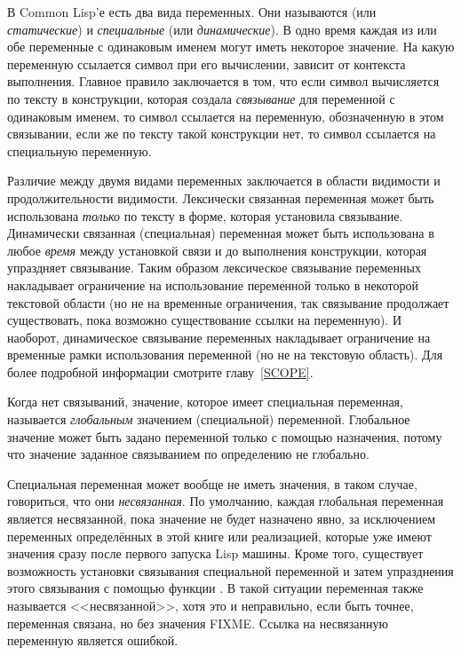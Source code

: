 В Common Lisp'е есть два вида переменных. Они называются  (или
\emph{статические}) и \emph{специальные} (или \emph{динамические}).
В одно время каждая из или обе переменные с одинаковым именем могут иметь
некоторое значение. На какую переменную ссылается символ при его вычислении,
зависит от контекста выполнения. Главное правило заключается в том, что если
символ вычисляется по тексту в конструкции, которая создала \emph{связывание} для
переменной с одинаковым именем, то символ ссылается на переменную, обозначенную
в этом связывании, если же по тексту такой конструкции нет, то символ ссылается
на специальную переменную.

Различие между двумя видами переменных заключается в области видимости и
продолжительности видимости. Лексически связанная переменная может быть использована
\emph{только} по тексту в форме, которая установила связывание. Динамически
связанная (специальная) переменная может быть использована в любое
\emph{время} между установкой связи и до выполнения конструкции, которая
упраздняет связывание. Таким образом лексическое связывание переменных
накладывает ограничение на использование переменной только в некоторой текстовой
области (но не на временные ограничения, так связывание продолжает существовать,
пока возможно существование ссылки на переменную). И наоборот, динамическое
связывание переменных накладывает ограничение на временные рамки использования
переменной (но не на текстовую область).
Для более подробной информации смотрите главу~\ref{SCOPE}.

Когда нет связываний, значение, которое имеет специальная
переменная, называется \emph{глобальным} значением (специальной) переменной.
Глобальное значение может быть задано переменной только с помощью назначения,
потому что значение заданное связыванием по определению не глобально.

Специальная переменная может вообще не иметь значения, в таком случае,
говориться, что они \emph{несвязанная}. 
По умолчанию, каждая глобальная переменная является несвязанной, пока значение
не будет назначено явно, за исключением переменных определённых в этой книге или
реализацией, которые уже имеют значения сразу после первого запуска Lisp машины.
Кроме того, существует возможность установки связывания специальной переменной и
затем упразднения этого связывания с помощью функции . В такой
ситуации переменная также называется <<несвязанной>>, хотя это и неправильно,
если быть точнее, переменная связана, но без значения FIXME. Ссылка на несвязанную
переменную является ошибкой.

